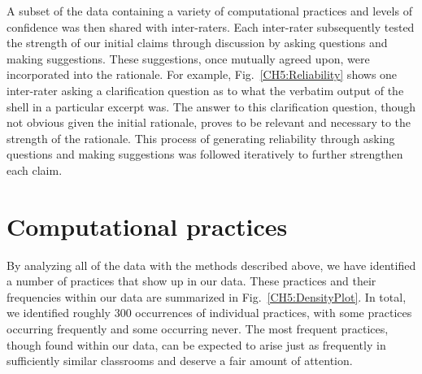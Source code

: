 \documentclass{msuphddissertation}
\begin{document}
\begin{doublespace}
A subset of the data containing a variety of computational practices and levels of confidence was then shared with inter-raters.  Each inter-rater subsequently tested the strength of our initial claims through discussion by asking questions and making suggestions.  These suggestions, once mutually agreed upon, were incorporated into the rationale.  For example, Fig.~\ref{CH5:Reliability} shows one inter-rater asking a clarification question as to what the verbatim output of the shell in a particular excerpt was.  The answer to this clarification question, though not obvious given the initial rationale, proves to be relevant and necessary to the strength of the rationale.  This process of generating reliability through asking questions and making suggestions was followed iteratively to further strengthen each claim.

\section{Computational practices}\label{CH5:Practices}

By analyzing all of the data with the methods described above, we have identified a number of practices that show up in our data.  These practices and their frequencies within our data are summarized in Fig.~\ref{CH5:DensityPlot}.  In total, we identified roughly 300 occurrences of individual practices, with some practices occurring frequently and some occurring never.  The most frequent practices, though found within our data, can be expected to arise just as frequently in sufficiently similar classrooms and deserve a fair amount of attention.


\end{doublespace}
\end{document}
